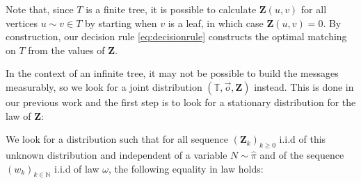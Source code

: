 \documentclass[11pt]{article}
\begin{document}
Note that, since $T$ is a finite tree, it is possible to calculate $\mathbf{Z}(u,v)$ for all vertices $u \sim v \in T$ by starting when $v$ is a leaf, in which case $\mathbf{Z}(u,v) = 0$. By construction, our decision rule \eqref{eq:decisionrule} constructs the optimal matching on $T$ from the values of $\mathbf{Z}$.

In the context of an infinite tree, it may not be possible to build the messages measurably, so we look for a joint distribution $(\mathbb{T},\overset{\rightarrow}{o},\mathbf{Z})$ instead. This is done in our previous work \cite{enriquez2024optimalunimodularmatching} and the first step is to look for a stationary distribution for the law of $\mathbf{Z}$:

We look for a distribution such that for all sequence $(\mathbf{Z}_k)_{k \geq 0}
    $ i.i.d of this unknown distribution and independent of a variable $N \sim \hat{\pi}$ and of the sequence $(w_k)_{k \in \mathbb{N}}$ i.i.d of law $\omega$, the following equality in law holds:
    
\end{document}
